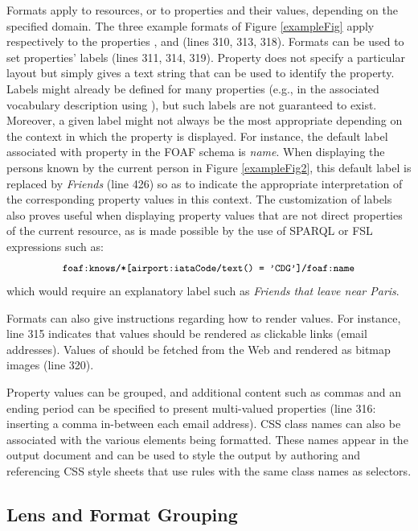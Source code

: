 Formats apply to resources, or to properties and their values, depending on the specified domain. The three example formats of Figure \ref{exampleFig} apply respectively to the properties ,  and  (lines 310, 313, 318). Formats can be used to set properties' labels (lines 311, 314, 319). Property  does not specify a particular layout but simply gives a text string that can be used to identify the property. Labels might already be defined for many properties (e.g., in the associated vocabulary description using ), but such labels are not guaranteed to exist. Moreover, a given label might not always be the most appropriate depending on the context in which the property is displayed. For instance, the default label associated with property  in the FOAF schema is {\em name}. When displaying the persons known by the current person in Figure \ref{exampleFig2}, this default label is replaced by {\em Friends} (line 426) so as to indicate the appropriate interpretation of the corresponding  property values in this context. The customization of labels also proves useful when displaying property values that are not direct properties of the current resource, as is made possible by the use of SPARQL or FSL expressions such as:
\[ \rdf{foaf:knows/*[airport:iataCode/text() = 'CDG']/foaf:name} \]
which would require an explanatory label such as {\em Friends that leave near Paris}.

Formats can also give instructions regarding how to render values. For instance, line 315 indicates that  values should be rendered as clickable links (email addresses). Values of  should be fetched from the Web and rendered as bitmap images (line 320).

Property values can be grouped, and additional content such as commas and an ending period can be specified to present multi-valued properties (line 316: inserting a comma in-between each email address). CSS class names can also be associated with the various elements being formatted. These names appear in the output document and can be used to style the output by authoring and referencing CSS style sheets that use rules with the same class names as selectors.

\subsection{Lens and Format Grouping}

